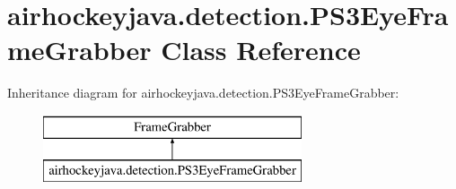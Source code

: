 \hypertarget{classairhockeyjava_1_1detection_1_1_p_s3_eye_frame_grabber}{}\section{airhockeyjava.\+detection.\+P\+S3\+Eye\+Frame\+Grabber Class Reference}
\label{classairhockeyjava_1_1detection_1_1_p_s3_eye_frame_grabber}
Inheritance diagram for airhockeyjava.\+detection.\+P\+S3\+Eye\+Frame\+Grabber\+:\begin{figure}[H]
\begin{center}
\leavevmode
\includegraphics[height=2.000000cm]{classairhockeyjava_1_1detection_1_1_p_s3_eye_frame_grabber}
\end{center}
\end{figure}
